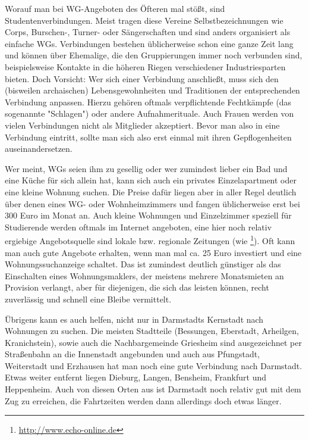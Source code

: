 {Worauf man bei WG-Angeboten des Öfteren mal stößt, sind Studentenverbindungen. Meist tragen diese Vereine Selbstbezeichnungen wie Corps, Burschen-, Turner- oder Sängerschaften und sind anders organisiert als einfache WGs. Verbindungen bestehen üblicherweise schon eine ganze Zeit lang und können über Ehemalige, die den Gruppierungen immer noch verbunden sind, beispielsweise Kontakte in die höheren Riegen verschiedener Industriesparten bieten. Doch Vorsicht: Wer sich einer Verbindung anschließt, muss sich den (bisweilen archaischen) Lebensgewohnheiten und Traditionen der entsprechenden Verbindung anpassen. Hierzu gehören oftmals verpflichtende Fechtkämpfe (das sogenannte "Schlagen") oder andere Aufnahmerituale. Auch Frauen werden von vielen Verbindungen nicht als Mitglieder akzeptiert.
Bevor man also in eine Verbindung eintritt, sollte man sich also erst einmal mit ihren Gepflogenheiten auseinandersetzen.

Wer meint, WGs seien ihm zu gesellig oder wer zumindest lieber ein Bad und eine Küche für sich allein hat, kann sich auch ein privates Einzelapartment oder eine kleine Wohnung suchen. Die Preise dafür liegen aber in aller Regel deutlich über denen eines WG- oder Wohnheimzimmers und fangen üblicherweise erst bei 300 Euro im Monat an. Auch kleine Wohnungen und Einzelzimmer speziell für Studierende werden oftmals im Internet angeboten, eine hier noch relativ ergiebige Angebotsquelle sind lokale bzw. regionale Zeitungen (wie \footnote{\url{http://www.echo-online.de}}). Oft kann man auch gute Angebote erhalten, wenn man mal ca. 25 Euro investiert und eine Wohnungssuchanzeige schaltet. Das ist zumindest deutlich günstiger als das Einschalten eines Wohnungsmaklers, der meistens mehrere Monatsmieten an Provision verlangt, aber für diejenigen, die sich das leisten können, recht zuverlässig und schnell eine Bleibe vermittelt.

Übrigens kann es auch helfen, nicht nur in Darmstadts Kernstadt nach Wohnungen zu suchen. Die meisten Stadtteile (Bessungen, Eberstadt, Arheilgen, Kranichstein), sowie auch die Nachbargemeinde Griesheim sind ausgezeichnet per Straßenbahn an die Innenstadt angebunden und auch aus Pfungstadt, Weiterstadt und Erzhausen hat man noch eine gute Verbindung nach Darmstadt. Etwas weiter entfernt liegen Dieburg, Langen, Bensheim, Frankfurt und Heppenheim. Auch von diesen Orten aus ist Darmstadt noch relativ gut mit dem Zug zu erreichen, die Fahrtzeiten werden dann allerdings doch etwas länger. 
}
{}


\newpage
